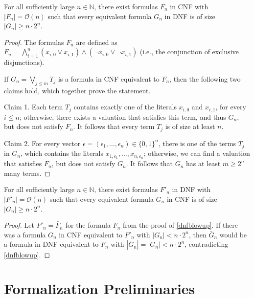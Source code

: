 \documentclass[a4paper,USenglish,cleveref, autoref, thm-restate]{lipics-v2021}
\newcommand{\Nat}{\mathbb{N}}
\theoremstyle{definition}
\begin{document}
\begin{theorem} \label{dnfblowup}
  For all sufficiently large $n\in\Nat$, there exist formulas $F_n$ in
  CNF with $|F_n| = \mathcal{O}(n)$ such that every equivalent formula $G_n$ in
  DNF is of size $|G_n| \geq n \cdot 2^n$.
\end{theorem}
\begin{proof}
The formulas $F_n$ are defined as
$F_n = \bigwedge_{i=1}^n ( x_{i,0} \lor x_{i,1} ) \land (\neg x_{i,0} \lor \neg x_{i,1})$
(i.e., the conjunction of exclusive disjunctions).

If $G_n = \bigvee_{j\leq m} T_j$ is a formula in CNF equivalent to $F_n$, then the following two claims hold, which together prove the statement.

Claim 1. Each term $T_j$ contains exactly one of the literals $x_{i,0}$ and $x_{i,1}$, for every $i\leq n$;
otherwise, there exists a valuation that satisfies this term, and thus $G_n$, but does not satisfy $F_n$.
It follows that every term $T_j$ is of size at least $n$.

Claim 2. For every vector
$\epsilon = (\epsilon_1 , \ldots ,\epsilon_n) \in \{ 0,1 \}^n$,
there is one of the terms $T_j$ in  $G_n$, which contains the literals
$x_{1,\epsilon_1}, \ldots , x_{n,\epsilon_n}$;
otherwise, we can find a valuation that satisfies $F_n$, but does not satisfy $G_n$.
It follows that $G_n$ has at least $m \geq 2^n$ many terms.
\end{proof}

\begin{theorem} \label{cnfblowup}
  For all sufficiently large $n\in\Nat$, there exist formulas $F'_n$ in
  DNF with $|F'_n| = \mathcal{O}(n)$ such that every equivalent formula $G_n$
  in CNF is of size $|G_n| \geq n \cdot 2^n$.
\end{theorem}

\begin{proof}
  Let $F'_n = {\bar F}_n$ for the formula $F_n$ from the proof of \cref{dnfblowup}.
  If there was a formula  $G_n$ in CNF equivalent to $F'_n$ with $\left|G_n\right| < n \cdot 2^n$,
  then ${\bar{G}}_n$ would be a formula in DNF equivalent to $F_n$ with
  $|{\bar{G}}_n| = |G_n| < n \cdot 2^n$, contradicting \cref{dnfblowup}.
\end{proof}


\section{Formalization Preliminaries}
\label{sec_preliminaries}
\end{document}
